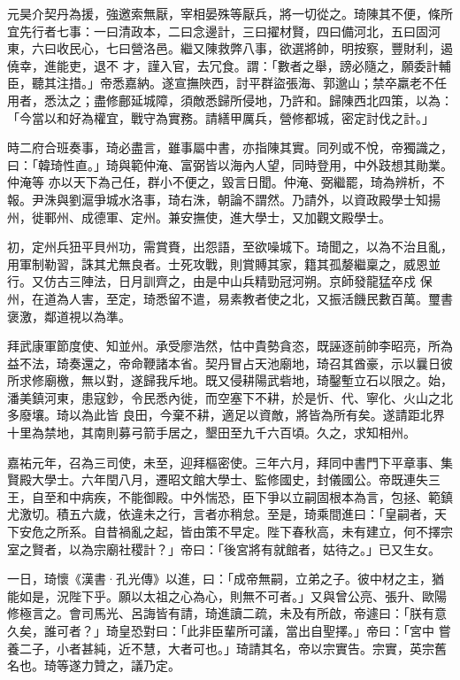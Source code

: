 \begin{pinyinscope}
 元昊介契丹為援，強邀索無厭，宰相晏殊等厭兵，將一切從之。琦陳其不便，條所宜先行者七事：一曰清政本，二曰念邊計，三曰擢材賢，四曰備河北，五曰固河東，六曰收民心，七曰營洛邑。繼又陳救弊八事，欲選將帥，明按察，豐財利，遏僥幸，進能吏，退不
 才，謹入官，去冗食。謂：「數者之舉，謗必隨之，願委計輔臣，聽其注措。」帝悉嘉納。遂宣撫陜西，討平群盜張海、郭邈山；禁卒羸老不任用者，悉汰之；盡修鄜延城障，須敵悉歸所侵地，乃許和。歸陳西北四策，以為：「今當以和好為權宜，戰守為實務。請繕甲厲兵，營修都城，密定討伐之計。」



 時二府合班奏事，琦必盡言，雖事屬中書，亦指陳其實。同列或不悅，帝獨識之，曰：「韓琦性直。」琦與範仲淹、富弼皆以海內人望，同時登用，中外跂想其勛業。仲淹等
 亦以天下為己任，群小不便之，毀言日聞。仲淹、弼繼罷，琦為辨析，不報。尹洙與劉滬爭城水洛事，琦右洙，朝論不謂然。乃請外，以資政殿學士知揚州，徙鄆州、成德軍、定州。兼安撫使，進大學士，又加觀文殿學士。



 初，定州兵狃平貝州功，需賞賚，出怨語，至欲噪城下。琦聞之，以為不治且亂，用軍制勒習，誅其尤無良者。士死攻戰，則賞賻其家，籍其孤嫠繼稟之，威恩並行。又仿古三陣法，日月訓齊之，由是中山兵精勁冠河朔。京師發龍猛卒戍
 保州，在道為人害，至定，琦悉留不遣，易素教者使之北，又振活饑民數百萬。璽書褒激，鄰道視以為準。



 拜武康軍節度使、知並州。承受廖浩然，怙中貴勢貪恣，既誣逐前帥李昭亮，所為益不法，琦奏還之，帝命鞭諸本省。契丹冒占天池廟地，琦召其酋豪，示以曩日彼所求修廟檄，無以對，遂歸我斥地。既又侵耕陽武砦地，琦鑿塹立石以限之。始，潘美鎮河東，患寇鈔，令民悉內徙，而空塞下不耕，於是忻、代、寧化、火山之北多廢壤。琦以為此皆
 良田，今棄不耕，適足以資敵，將皆為所有矣。遂請距北界十里為禁地，其南則募弓箭手居之，墾田至九千六百頃。久之，求知相州。



 嘉祐元年，召為三司使，未至，迎拜樞密使。三年六月，拜同中書門下平章事、集賢殿大學士。六年閏八月，遷昭文館大學士、監修國史，封儀國公。帝既連失三王，自至和中病疾，不能御殿。中外惴恐，臣下爭以立嗣固根本為言，包拯、範鎮尤激切。積五六歲，依違未之行，言者亦稍怠。至是，琦乘間進曰：「皇嗣者，天
 下安危之所系。自昔禍亂之起，皆由策不早定。陛下春秋高，未有建立，何不擇宗室之賢者，以為宗廟社稷計？」帝曰：「後宮將有就館者，姑待之。」已又生女。



 一日，琦懷《漢書·孔光傳》以進，曰：「成帝無嗣，立弟之子。彼中材之主，猶能如是，況陛下乎。願以太祖之心為心，則無不可者。」又與曾公亮、張升、歐陽修極言之。會司馬光、呂誨皆有請，琦進讀二疏，未及有所啟，帝遽曰：「朕有意久矣，誰可者？」琦皇恐對曰：「此非臣輩所可議，當出自聖擇。」帝曰：「宮中
 嘗養二子，小者甚純，近不慧，大者可也。」琦請其名，帝以宗實告。宗實，英宗舊名也。琦等遂力贊之，議乃定。




\end{pinyinscope}
